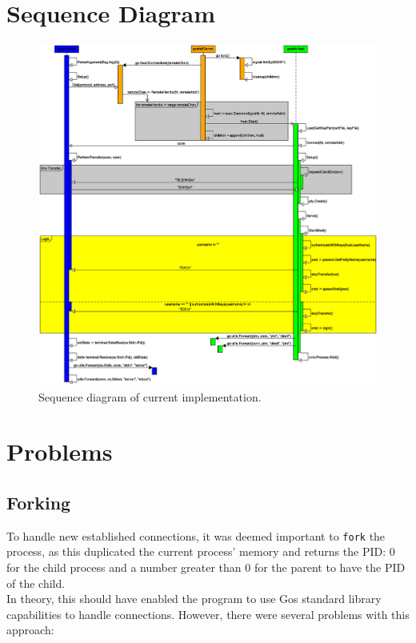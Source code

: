 \documentclass[10pt,a4paper,titlepage,twoside,english,final]{zhawreprt}
\begin{document}
\section{Sequence Diagram}\label{sec:SequenceDiagram}
\begin{figure}[ht]
\includegraphics[width=\textwidth]{SequenceDiagramNew}
\caption{Sequence diagram of current implementation.}
\label{fig:SeqDiaCurrent}
\end{figure}

\section{Problems}\label{sec:Problems}
\subsection{Forking}\label{ssec:Forking}
To handle new established connections, it was deemed important to \texttt{fork} the process, as this duplicated the current process' memory and returns the \gls{PID}: 0 for the child process and a number greater than 0 for the parent to have the \gls{PID} of the child.\\
In theory, this should have enabled the program to use \gls{Go}s standard library capabilities to handle connections. However, there were several problems with this approach:
\end{document}
